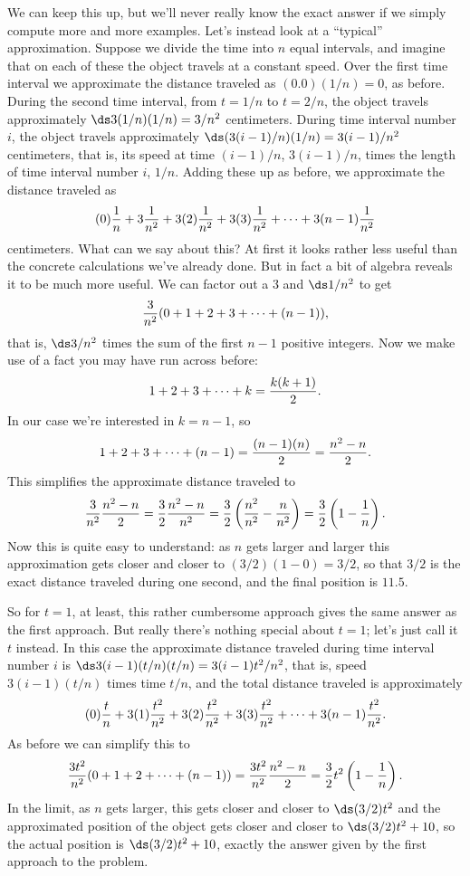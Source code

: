 \begin{example}
We can keep this up, but we'll never really know the exact answer if
we simply compute more and more examples. Let's instead look at a
``typical'' approximation. Suppose we divide the time into $n$ equal
intervals, and imagine that on each of these the object travels at a
constant speed. Over the first time interval we approximate the
distance traveled as $(0.0)(1/n)=0$, as before. During the second time
interval, from $t=1/n$ to $t=2/n$, the object travels approximately
$\ds 3(1/n)(1/n)=3/n^2$ centimeters. During time interval number $i$, the
object travels approximately $\ds (3(i-1)/n)(1/n)=3(i-1)/n^2$
centimeters, that is, its speed at time $(i-1)/n$, $3(i-1)/n$, times
the length of time interval number $i$, $1/n$.
Adding these up as before, we approximate the distance traveled as
$$
  (0){1\over n}+3{1\over n^2}+3(2){1\over n^2}+
  3(3){1\over n^2}+\cdots+3(n-1){1\over n^2}
$$
centimeters. What can we say about this? At first it looks rather less
useful than the concrete calculations we've already done. But in fact
a bit of algebra reveals it to be much more useful. We can factor out
a 3 and $\ds 1/n^2$ to get
$$
  {3\over n^2}(0+1+2+3+\cdots+(n-1)),
$$
that is, $\ds 3/n^2$ times the sum of the first $n-1$ positive
integers. Now we make use of a fact you may have run across before:
$$
  1+2+3+\cdots+k={k(k+1)\over2}.
$$
In our case we're interested in $k=n-1$, so
$$
  1+2+3+\cdots+(n-1)={(n-1)(n)\over2}={n^2-n\over2}.
$$
This simplifies the approximate distance traveled to 
$$
  {3\over n^2}{n^2-n\over2}={3\over2}{n^2-n\over n^2}=
  {3\over2}\left({n^2\over n^2}-{n\over n^2}\right)=
  {3\over2}\left(1-{1\over n}\right).
$$
Now this is quite easy to understand: as $n$ gets larger and larger
this approximation gets closer and closer to $(3/2)(1-0)=3/2$, so that
$3/2$ is the exact distance traveled during one second, and the final
position is $11.5$.

So for $t=1$, at least, this rather cumbersome approach gives the same
answer as the first approach. But really there's nothing special about
$t=1$; let's just call it $t$ instead. In this case the approximate
distance traveled during time interval number $i$ is $\ds
3(i-1)(t/n)(t/n)=3(i-1)t^2/n^2$, that is, speed $3(i-1)(t/n)$ times
time $t/n$, and the total distance traveled is approximately
$$
  (0){t\over n}+3(1){t^2\over n^2}+3(2){t^2\over n^2}+
  3(3){t^2\over n^2}+\cdots+3(n-1){t^2\over n^2}.
$$
As before we can simplify this to
$$
  {3t^2\over n^2}(0+1+2+\cdots+(n-1))={3t^2\over n^2}{n^2-n\over2}=
  {3\over2}t^2\left(1-{1\over n}\right).
$$ 
In the limit, as $n$ gets larger, this gets closer and closer to $\ds
(3/2)t^2$ and the approximated position of the object gets closer and
closer to $\ds (3/2)t^2+10$, so the actual position is $\ds
(3/2)t^2+10$, exactly the answer given by the first approach to the
problem.
\end{example}

